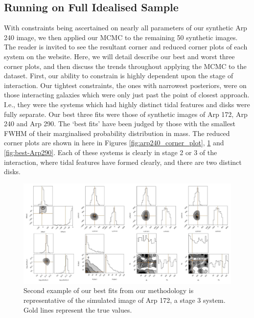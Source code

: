 \subsection{Running on Full Idealised Sample}
\noindent With constraints being ascertained on nearly all parameters of our synthetic Arp 240 image, we then applied our MCMC to the remaining 50 synthetic images. The reader is invited to see the resultant corner and reduced corner plots of each system on the website. Here, we will detail describe our best and worst three corner plots, and then discuss the trends throughout applying the MCMC to the dataset. First, our ability to constrain is highly dependent upon the stage of interaction. Our tightest constraints, the ones with narrowest posteriors, were on those interacting galaxies which were only just past the point of closest approach. I.e., they were the systems which had highly distinct tidal features and disks were fully separate. Our best three fits were those of synthetic images of Arp 172, Arp 240 and Arp 290. The `best fits' have been judged by those with the smallest FWHM of their marginalised probability distribution in mass. The reduced corner plots are shown in here in Figures \ref{fig:arp240_corner_plot}, \ref{fig:best-Arp172} and \ref{fig:best-Arp290}. Each of these systems is clearly in stage 2 or 3 of the interaction, where tidal features have formed clearly, and there are two distinct disks.

\begin{figure}
    \centering
    \includegraphics[width=\textwidth]{Chapter1/figures/Arp172-red-corner.pdf}
    \caption{Second example of our best fits from our methodology is representative of the simulated image of Arp 172, a stage 3 system. Gold lines represent the true values.}
    \label{fig:best-Arp172}
\end{figure}

